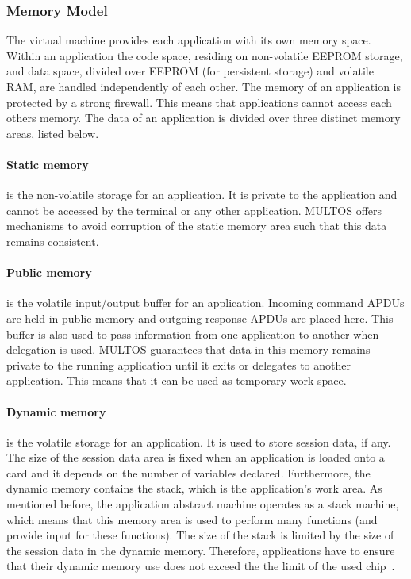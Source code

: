 \subsubsection{Memory Model}

The virtual machine provides each application with its own memory space. Within
an application the code space, residing on non-volatile EEPROM
 storage, and data space, divided over
EEPROM (for persistent storage) and volatile RAM, are handled independently of each other. The memory of an
application is protected by a strong firewall. This means that applications
cannot access each others memory. The data of an application is divided over
three distinct memory areas, listed below.

\paragraph{Static memory} is the non-volatile storage for an application. It is
private to the application and cannot be accessed by the terminal or any other
application. MULTOS offers mechanisms to avoid corruption of the static memory
area such that this data remains consistent.

\paragraph{Public memory} is the volatile input/output buffer for an
application. Incoming command APDUs are held in public memory and outgoing
response APDUs are placed here. This buffer is also used to pass information
from one application to another when delegation is used. MULTOS guarantees that
data in this memory remains private to the running application until it exits
or delegates to another application. This means that it can be used as
temporary work space.

\paragraph{Dynamic memory} is the volatile storage for an application. It is
used to store session data, if any. The size of the session data area is fixed
when an application is loaded onto a card and it depends on the number of
variables declared. Furthermore, the dynamic memory contains the stack, which
is the application's work area. As mentioned before, the application abstract
machine operates as a stack machine, which means that this memory area is used
to perform many functions (and provide input for these functions). The size of 
the stack is limited by the size of the session data in the dynamic memory. 
Therefore, applications have to ensure that their dynamic memory use does not 
exceed the the limit of the used chip~\cite{MIR2012}. 

